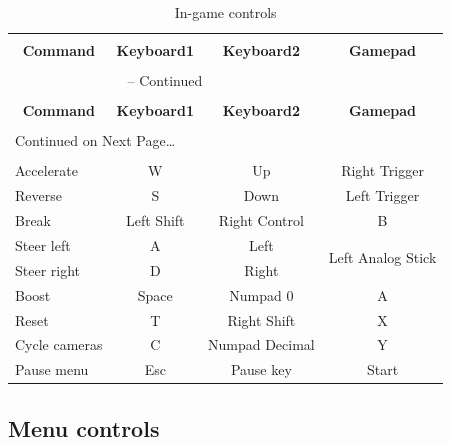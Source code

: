 \documentclass[11pt]{article}
\begin{document}
\begin{center}
\begin{longtable}{lccc}
\caption{In-game controls} \label{ingame-controls-table} \\

\hline \hline \\[-2ex]
   \multicolumn{1}{c}{\textbf{Command}} &
   \multicolumn{1}{c}{\textbf{Keyboard1}} &
   \multicolumn{1}{c}{\textbf{Keyboard2}} &
   \multicolumn{1}{c}{\textbf{Gamepad}} \\[0.5ex] \hline
   \\[-1.8ex]
\endfirsthead

\multicolumn{3}{c}{{\tablename} \thetable{} -- Continued} \\[0.5ex]
  \hline \hline \\[-2ex]
  \multicolumn{1}{c}{\textbf{Command}} &
  \multicolumn{1}{c}{\textbf{Keyboard1}} &
  \multicolumn{1}{c}{\textbf{Keyboard2}} &
  \multicolumn{1}{c}{\textbf{Gamepad}} \\[0.5ex] \hline
  \\[-1.8ex]
\endhead

  \multicolumn{3}{l}{{Continued on Next Page\ldots}} \\
\endfoot

  \\[-1.8ex] \hline \hline
\endlastfoot

Accelerate & W & Up & Right Trigger \\ 
Reverse & S & Down & Left Trigger \\
Break & Left Shift & Right Control & B \\ 
Steer left & A & Left & \multirow{2}{*}{Left Analog Stick} \\ 
Steer right & D & Right \\
Boost & Space & Numpad 0 & A \\
Reset & T & Right Shift & X \\
Cycle cameras & C & Numpad Decimal & Y \\
Pause menu & Esc & Pause key & Start \\
\end{longtable}
\end{center}

\subsection{Menu controls}
\end{document}
